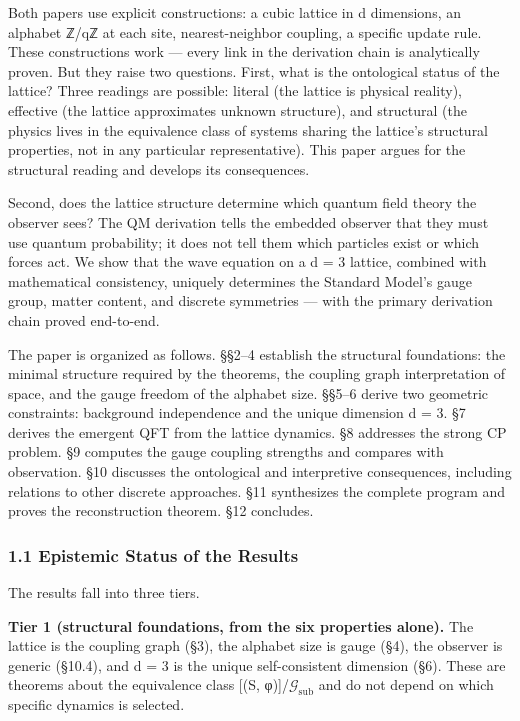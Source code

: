 \documentclass[
  11pt,
]{article}
\begin{document}
Both papers use explicit constructions: a cubic lattice in d dimensions,
an alphabet ℤ/qℤ at each site, nearest-neighbor coupling, a specific
update rule. These constructions work --- every link in the derivation
chain is analytically proven. But they raise two questions. First, what
is the ontological status of the lattice? Three readings are possible:
literal (the lattice is physical reality), effective (the lattice
approximates unknown structure), and structural (the physics lives in
the equivalence class of systems sharing the lattice's structural
properties, not in any particular representative). This paper argues for
the structural reading and develops its consequences.

Second, does the lattice structure determine which quantum field theory
the observer sees? The QM derivation tells the embedded observer that
they must use quantum probability; it does not tell them which particles
exist or which forces act. We show that the wave equation on a d = 3
lattice, combined with mathematical consistency, uniquely determines the
Standard Model's gauge group, matter content, and discrete symmetries
--- with the primary derivation chain proved end-to-end.

The paper is organized as follows. §§2--4 establish the structural
foundations: the minimal structure required by the theorems, the
coupling graph interpretation of space, and the gauge freedom of the
alphabet size. §§5--6 derive two geometric constraints: background
independence and the unique dimension d = 3. §7 derives the emergent QFT
from the lattice dynamics. §8 addresses the strong CP problem. §9
computes the gauge coupling strengths and compares with observation. §10
discusses the ontological and interpretive consequences, including
relations to other discrete approaches. §11 synthesizes the complete
program and proves the reconstruction theorem. §12 concludes.

\hypertarget{epistemic-status-of-the-results}{%
\subsubsection{1.1 Epistemic Status of the
Results}\label{epistemic-status-of-the-results}}

The results fall into three tiers.

\textbf{Tier 1 (structural foundations, from the six properties alone).}
The lattice is the coupling graph (§3), the alphabet size is gauge (§4),
the observer is generic (§10.4), and d = 3 is the unique self-consistent
dimension (§6). These are theorems about the equivalence class {[}(S,
φ){]}/\(\mathcal{G}_{\text{sub}}\) and do not depend on which specific
dynamics is selected.
\end{document}
